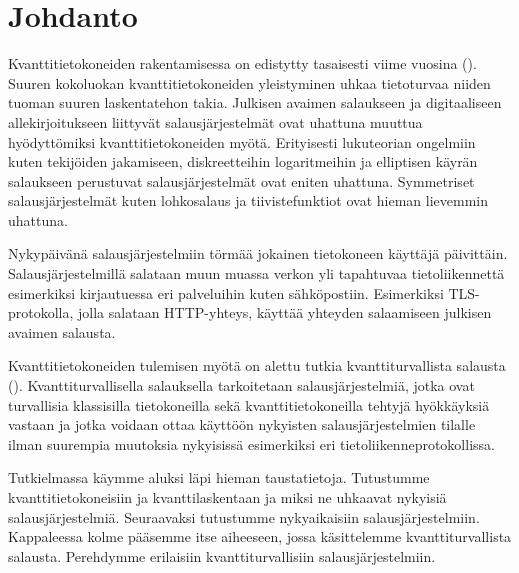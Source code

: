 \chapter{Johdanto\label{intro}}
Kvanttitietokoneiden rakentamisessa on edistytty tasaisesti viime vuosina (\cite{alagic2020status}). Suuren kokoluokan kvanttitietokoneiden yleistyminen uhkaa tietoturvaa niiden tuoman suuren laskentatehon takia. Julkisen avaimen salaukseen ja digitaaliseen allekirjoitukseen liittyvät salausjärjestelmät ovat uhattuna muuttua hyödyttömiksi kvanttitietokoneiden myötä. Erityisesti lukuteorian ongelmiin kuten tekijöiden jakamiseen, diskreetteihin logaritmeihin ja elliptisen käyrän salaukseen perustuvat salausjärjestelmät ovat eniten uhattuna. Symmetriset salausjärjestelmät kuten lohkosalaus ja tiivistefunktiot ovat hieman lievemmin uhattuna.

Nykypäivänä salausjärjestelmiin törmää jokainen tietokoneen käyttäjä päivittäin. Salausjärjestelmillä salataan muun muassa verkon yli tapahtuvaa tietoliikennettä esimerkiksi kirjautuessa eri palveluihin kuten sähköpostiin. Esimerkiksi TLS-protokolla, jolla salataan HTTP-yhteys, käyttää yhteyden salaamiseen julkisen avaimen salausta. 

Kvanttitietokoneiden tulemisen myötä on alettu tutkia kvanttiturvallista salausta (\cite{alagic2020status}). Kvanttiturvallisella salauksella tarkoitetaan salausjärjestelmiä, jotka ovat turvallisia klassisilla tietokoneilla sekä kvanttitietokoneilla tehtyjä hyökkäyksiä vastaan ja jotka voidaan ottaa käyttöön nykyisten salausjärjestelmien tilalle ilman suurempia muutoksia nykyisissä esimerkiksi eri tietoliikenneprotokollissa.

Tutkielmassa käymme aluksi läpi hieman taustatietoja. Tutustumme kvanttitietokoneisiin ja kvanttilaskentaan ja miksi ne uhkaavat nykyisiä salausjärjestelmiä. Seuraavaksi tutustumme nykyaikaisiin salausjärjestelmiin. Kappaleessa kolme pääsemme itse aiheeseen, jossa käsittelemme kvanttiturvallista salausta. Perehdymme erilaisiin kvanttiturvallisiin salausjärjestelmiin.